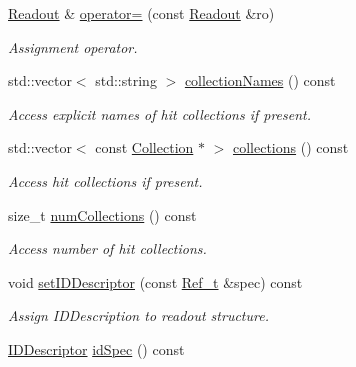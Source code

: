 \begin{DoxyCompactItemize}
\hyperlink{class_d_d4hep_1_1_geometry_1_1_readout}{Readout} \& \hyperlink{class_d_d4hep_1_1_geometry_1_1_readout_aeb7539a6b7ffb865b31eba7d9ee131ca}{operator=} (const \hyperlink{class_d_d4hep_1_1_geometry_1_1_readout}{Readout} \&ro)
\begin{DoxyCompactList}\small\item\em Assignment operator. \item\end{DoxyCompactList}\item 
std::vector$<$ std::string $>$ \hyperlink{class_d_d4hep_1_1_geometry_1_1_readout_a1cf59ee8e3bd2e3ffb2bf0a50173fbcc}{collectionNames} () const 
\begin{DoxyCompactList}\small\item\em Access explicit names of hit collections if present. \item\end{DoxyCompactList}\item 
std::vector$<$ const \hyperlink{class_d_d4hep_1_1_geometry_1_1_hit_collection}{Collection} $\ast$ $>$ \hyperlink{class_d_d4hep_1_1_geometry_1_1_readout_a2b32b65ef9314b2905205278a1b6135f}{collections} () const 
\begin{DoxyCompactList}\small\item\em Access hit collections if present. \item\end{DoxyCompactList}\item 
size\_\-t \hyperlink{class_d_d4hep_1_1_geometry_1_1_readout_aff0e1b36d7094da921d4a7b7db7a2709}{numCollections} () const 
\begin{DoxyCompactList}\small\item\em Access number of hit collections. \item\end{DoxyCompactList}\item 
void \hyperlink{class_d_d4hep_1_1_geometry_1_1_readout_a8317f078c7f2601d5d4f6dfe667730d4}{setIDDescriptor} (const \hyperlink{group___d_d4_h_e_p___g_e_o_m_e_t_r_y_ga40af83be6718bb8828a3d83dc7f8c930}{Ref\_\-t} \&spec) const 
\begin{DoxyCompactList}\small\item\em Assign IDDescription to readout structure. \item\end{DoxyCompactList}\item 
\hyperlink{class_d_d4hep_1_1_geometry_1_1_i_d_descriptor}{IDDescriptor} \hyperlink{class_d_d4hep_1_1_geometry_1_1_readout_a9db067ef343155e31bd6d526fbe4a0f6}{idSpec} () const 

\end{DoxyCompactItemize}
